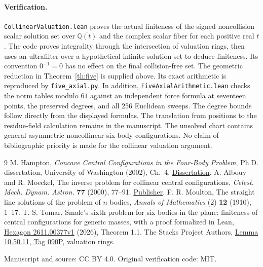 \documentclass[11pt]{article}
\begin{document}
\paragraph{Verification.} \texttt{CollinearValuation.lean} proves the actual finiteness of the signed noncollision scalar solution set over $\overline{\mathbb Q(t)}$ and the complex scalar fiber for each positive real $t$. The code proves integrality through the intersection of valuation rings, then uses an ultrafilter over a hypothetical infinite solution set to deduce finiteness. Its convention $0^{-1}=0$ has no effect on the final collision-free set. The geometric reduction in Theorem~\ref{th:five} is supplied above. Its exact arithmetic is reproduced by \texttt{five\_axial.py}. In addition, \texttt{FiveAxialArithmetic.lean} checks the norm tables modulo $61$ against an independent force formula at seventeen points, the preserved degrees, and all 256 Euclidean sweeps. The degree bounds follow directly from the displayed formulas. The translation from positions to the residue-field calculation remains in the manuscript. The unsolved chart contains general asymmetric noncollinear six-body configurations. No claim of bibliographic priority is made for the collinear valuation argument.

\begin{thebibliography}{9}
 M. Hampton, \emph{Concave Central Configurations in the Four-Body Problem}, Ph.D. dissertation, University of Washington (2002), Ch.~4. \href{https://www.d.umn.edu/~mhampton/MarshallHamptonThesisPreprint.pdf}{Dissertation}.
 A. Albouy and R. Moeckel, The inverse problem for collinear central configurations, \emph{Celest. Mech. Dynam. Astron.} \textbf{77} (2000), 77--91. \href{https://doi.org/10.1023/A:1008345830461}{Publisher}.
 F. R. Moulton, The straight line solutions of the problem of $n$ bodies, \emph{Annals of Mathematics} (2) \textbf{12} (1910), 1--17.
 T. S. Tomar, Smale's sixth problem for six bodies in the plane: finiteness of central configurations for generic masses, with a proof formalized in Lean, \href{https://hexagonmath.org/2611.00377v1}{Hexagon 2611.00377v1} (2026), Theorem 1.1.
 The Stacks Project Authors, \href{https://stacks.math.columbia.edu/tag/090P}{Lemma 10.50.11, Tag 090P}, valuation rings.
\end{thebibliography}
\noindent Manuscript and source: CC BY 4.0. Original verification code: MIT.
\end{document}
